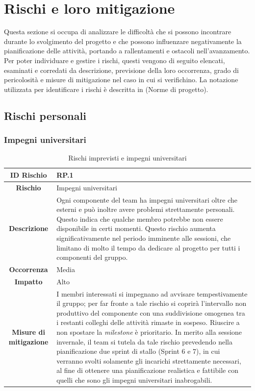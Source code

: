 \documentclass[10pt, a4paper]{article}
\begin{document}
\newpage

\section{Rischi e loro mitigazione}
\label{section:Rischi}
Questa sezione si occupa di analizzare le difficoltà che si possono incontrare durante lo svolgimento del progetto e che possono influenzare negativamente la pianificazione delle attività, portando a rallentamenti e ostacoli nell'avanzamento.\\
Per poter individuare e gestire i rischi, questi vengono di seguito elencati, esaminati e corredati da descrizione, previsione della loro occorrenza, grado di pericolosità e misure di mitigazione nel caso in cui si verifichino.
La notazione utilizzata per identificare i rischi è descritta in (Norme di progetto).

\subsection{Rischi personali}


\subsubsection{Impegni universitari}
{\renewcommand{\arraystretch}{1.5}
\begin{table}[H]
\begin{tabularx}{\textwidth}{c|X}
\textbf{ID Rischio} & RP.1 \\
\hline
\textbf{Rischio} & Impegni universitari\\
\hline
\textbf{Descrizione} & Ogni componente del team ha impegni universitari oltre che esterni e può inoltre avere problemi strettamente personali. Questo indica che qualche membro potrebbe non essere disponibile in certi momenti. Questo rischio aumenta significativamente nel periodo imminente alle sessioni, che limitano di molto il tempo da dedicare al progetto per tutti i componenti del gruppo. \\
\hline
\textbf{Occorrenza} & Media\\
\hline
\textbf{Impatto} & Alto\\
\hline
\textbf{Misure di mitigazione} & I membri interessati si impegnano ad avvisare tempestivamente il gruppo; per far fronte a tale rischio si coprirà l’intervallo non produttivo 
del componente con una suddivisione omogenea tra i restanti colleghi delle attività rimaste in sospeso.
Riuscire a non spostare la \textit{milestone} è prioritario.
In merito alla sessione invernale, il team si tutela da tale rischio prevedendo nella pianificazione due sprint di stallo (Sprint 6 e 7), in cui verranno svolti solamente gli incarichi 
strettamente necessari, al fine di ottenere una pianificazione realistica e fattibile con quelli che sono gli impegni universitari inabrogabili.\\
\end{tabularx}
\caption{Rischi imprevisti e impegni universitari}
\end{table}}
\end{document}
